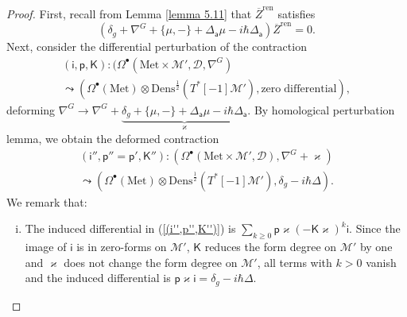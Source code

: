 \documentclass[11pt,a4paper]{amsart}
\theoremstyle{plain} %
\theoremstyle{definition}
\theoremstyle{remark}
\newcommand{\mr}{\mathrm}
\newcommand{\sfa}{\mathsf{a}}
\newcommand{\bt}{\bullet}
\newcommand{\ra}{\rightarrow}
\newcommand{\M}{\mathcal{M}}
\newcommand{\mc}{\mathcal}
\begin{document}
\begin{proof}
First, recall from Lemma \ref{lemma 5.11} that $\overline{Z}^\mr{ren}$ satisfies
\begin{equation}
    (\delta_g+\nabla^G+\{\mu,-\}+\Delta_\sfa\mu-i\hbar \Delta_\sfa) \overline{Z}^\mr{ren}=0.
\end{equation}
Next, consider the differential perturbation of the contraction
\begin{multline}
    (\mathsf{i},\mathsf{p},\mathsf{K})\colon (\Omega^\bt(\mr{Met}\times \M',\mc{D},\nabla^G)  \\ \leadsto 
    (\Omega^\bt(\mr{Met})\otimes \mr{Dens}^{\frac12}(T^*[-1]\M'),\mr{zero\; differential}),
\end{multline}
deforming $\nabla^G\ra \nabla^G+\underbrace{\delta_g+\{\mu,-\}+\Delta_\sfa\mu-i\hbar \Delta_\sfa}_\varkappa$. By homological perturbation lemma, we obtain the deformed contraction
\begin{multline}\label{(i'',p'',K'')}
    (\mathsf{i}'',\mathsf{p}''=\mathsf{p}',\mathsf{K}'')\colon (\Omega^\bt(\mr{Met}\times \M',\mc{D}),
    \nabla^G+\varkappa
    )  \\ \leadsto 
    (\Omega^\bt(\mr{Met})\otimes \mr{Dens}^{\frac12}(T^*[-1]\M'),\delta_g-i\hbar\Delta).
\end{multline}
We remark that:
\begin{enumerate}[(i)]
    \item The induced differential in (\ref{(i'',p'',K'')}) is 
    $\sum_{k\geq 0}\mathsf{p}\varkappa (-\mathsf{K}\varkappa)^k \mathsf{i}$. Since the image of $\mathsf{i}$ is in zero-forms on $\M'$, $\mathsf{K}$ reduces the form degree on $\M'$ by one and $\varkappa$ does not change the form degree on $\M'$, all terms with $k>0$ vanish and the induced differential is $\mathsf{p}\varkappa \mathsf{i}= \delta_g-i\hbar\Delta$.

\end{enumerate}
\end{proof}
\end{document}
